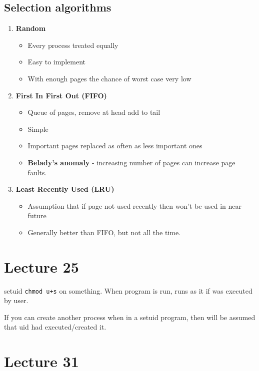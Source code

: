 \documentclass{article}
\begin{document}
	\subsection{Selection algorithms}
		\begin{enumerate}
			\item \textbf{Random}
			\begin{itemize}
				\item Every process treated equally
				\item Easy to implement
				\item With enough pages the chance of worst case very low
			\end{itemize}
			
			\item \textbf{First In First Out (FIFO)}
			\begin{itemize}
				\item Queue of pages, remove at head add to tail
				\item Simple
				\item Important pages replaced as often as less important ones
				\item \textbf{Belady's anomaly }- increasing number of pages can increase page faults.
			\end{itemize}
			
			\item \textbf{Least Recently Used (LRU)}
			\begin{itemize}
				\item Assumption that if page not used recently then won't be used in near future
				\item Generally better than FIFO, but not all the time.
			\end{itemize}

		\end{enumerate}

		

		
		

\section{Lecture 25}
	
	setuid
	\texttt{chmod u+s} on something. When program is run, runs as it if was executed by user.

	If you can create another process when in a setuid program, then will be assumed that uid had executed/created it.
	
	
\section{Lecture 31}
	
\end{document}
